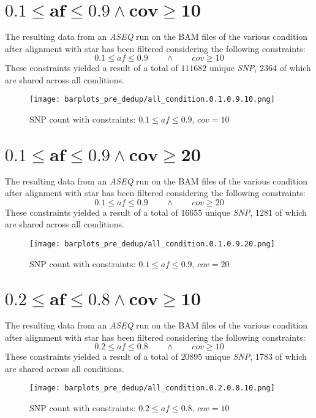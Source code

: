 \documentclass{article}
\begin{document}
\section*{$\mathbf{0.1\le af\le 0.9\land cov\ge 10}$}
The resulting data from an \emph{ASEQ} run on the BAM files of the various condition after alignment with star has been filtered considering the following constraints:
  $$0.1\le af\le 0.9\qquad\land\qquad cov\ge 10$$
	These constraints yielded a result of a total of $111682$ unique \emph{SNP}, $2364$ of which are shared across all conditions.
\begin{figure}[H]
  \texttt{[image: barplots\_pre\_dedup/all\_condition.0.1.0.9.10.png]}
\caption{SNP count with constraints: $0.1\le af \le 0.9$, $cov = 10$ }
\end{figure}


\section*{$\mathbf{0.1\le af\le 0.9\land cov\ge 20}$}
The resulting data from an \emph{ASEQ} run on the BAM files of the various condition after alignment with star has been filtered considering the following constraints:
  $$0.1\le af\le 0.9\qquad\land\qquad cov\ge 20$$
	These constraints yielded a result of a total of $16655$ unique \emph{SNP}, $1281$ of which are shared across all conditions.
\begin{figure}[H]
  \texttt{[image: barplots\_pre\_dedup/all\_condition.0.1.0.9.20.png]}
\caption{SNP count with constraints: $0.1\le af \le 0.9$, $cov = 20$ }
\end{figure}


\section*{$\mathbf{0.2\le af\le 0.8\land cov\ge 10}$}
The resulting data from an \emph{ASEQ} run on the BAM files of the various condition after alignment with star has been filtered considering the following constraints:
  $$0.2\le af\le 0.8\qquad\land\qquad cov\ge 10$$
	These constraints yielded a result of a total of $20895$ unique \emph{SNP}, $1783$ of which are shared across all conditions.
\begin{figure}[H]
  \texttt{[image: barplots\_pre\_dedup/all\_condition.0.2.0.8.10.png]}
\caption{SNP count with constraints: $0.2\le af \le 0.8$, $cov = 10$ }
\end{figure}

\end{document}
